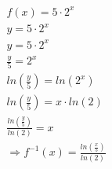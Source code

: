 \begin{beispiel}
	\begin{align*}
		f(x)=5\cdot2^x\tag{$f(x)$ zu $y$ umschreiben}\\
		y=5\cdot2^x\tag{Umformen nach $x$}\\
		y=5\cdot 2^x\tag{Dividieren von $5$}\\
		\frac{y}{5}=2^x\tag{Logarithmieren}\\
		ln\left(\frac{y}{5}\right)=ln(2^x)\tag{3. Logarithmusgesetz}\\
		ln\left(\frac{y}{5}\right)=x\cdot ln(2)\tag{Dividieren $ln(2)$}\\
		\frac{ln\left(\frac{y}{5}\right)}{ln(2)}=x\\
		\Rightarrow f^{-1}(x)=\frac{ln\left(\frac{x}{5}\right)}{ln(2)}
		\end{align*}
\end{beispiel}
\pagebreak